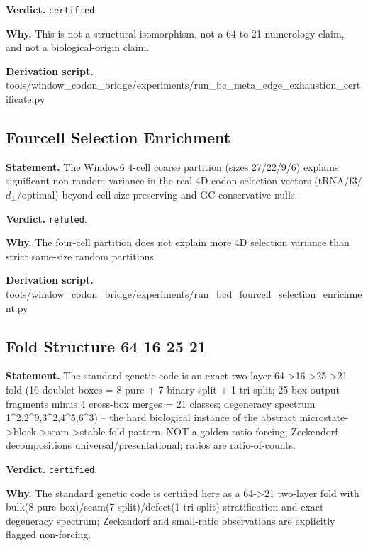 \textbf{Verdict.} \texttt{certified}.

\textbf{Why.} This is not a structural isomorphism, not a 64-to-21 numerology claim, and not a biological-origin
claim.

\textbf{Derivation script.} tools/window\_codon\_bridge/experiments/run\_bc\_meta\_edge\_exhaustion\_certificate.py

\subsection{Fourcell Selection Enrichment}\label{sec:bridge-fourcell-selection-enrichment}
\textbf{Statement.} The Window6 4-cell coarse partition (sizes 27/22/9/6) explains significant non-random variance in
the real 4D codon selection vectors (tRNA/f3/$d_{\perp}$/optimal) beyond cell-size-preserving and
GC-conservative nulls.

\textbf{Verdict.} \texttt{refuted}.

\textbf{Why.} The four-cell partition does not explain more 4D selection variance than strict same-size random
partitions.

\textbf{Derivation script.} tools/window\_codon\_bridge/experiments/run\_bcd\_fourcell\_selection\_enrichment.py

\subsection{Fold Structure 64 16 25 21}\label{sec:bridge-fold-structure-64-16-25-21}
\textbf{Statement.} The standard genetic code is an exact two-layer 64->16->25->21 fold (16 doublet boxes = 8 pure + 7
binary-split + 1 tri-split; 25 box-output fragments minus 4 cross-box merges = 21 classes;
degeneracy spectrum
1\textasciicircum{}2,2\textasciicircum{}9,3\textasciicircum{}2,4\textasciicircum{}5,6\textasciicircum{}3)
-- the hard biological instance of the abstract microstate->block->seam->stable fold pattern. NOT a
golden-ratio forcing; Zeckendorf decompositions universal/presentational; ratios are
ratio-of-counts.

\textbf{Verdict.} \texttt{certified}.

\textbf{Why.} The standard genetic code is certified here as a 64->21 two-layer fold with bulk(8 pure box)/seam(7
split)/defect(1 tri-split) stratification and exact degeneracy spectrum; Zeckendorf and small-ratio
observations are explicitly flagged non-forcing.

